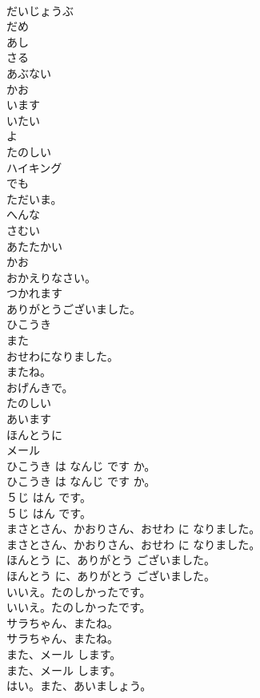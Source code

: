 \documentclass[8pt]{extreport}
\begin{document}
\begin{CJK}{UTF8}{min}
\\	だいじょうぶ
\\	だめ
\\	あし
\\	さる
\\	あぶない
\\	かお
\\	います
\\	いたい
\\	よ
\\	たのしい
\\	ハイキング
\\	でも
\\	ただいま。
\\	へんな
\\	さむい
\\	あたたかい
\\	かお
\\	おかえりなさい。
\\	つかれます
\\	ありがとうございました。
\\	ひこうき
\\	また
\\	おせわになりました。
\\	またね。
\\	おげんきで。
\\	たのしい
\\	あいます
\\	ほんとうに
\\	メール
\\	ひこうき は なんじ です か。	
\\	ひこうき は なんじ です か。 
\\	５じ はん です。	
\\	５じ はん です。 
\\	まさとさん、かおりさん、おせわ に なりました。	
\\	まさとさん、かおりさん、おせわ に なりました。 
\\	ほんとう に、ありがとう ございました。	
\\	ほんとう に、ありがとう ございました。 
\\	いいえ。たのしかったです。	
\\	いいえ。たのしかったです。 
\\	サラちゃん、またね。	
\\	サラちゃん、またね。 
\\	また、メール します。	
\\	また、メール します。 
\\	はい。また、あいましょう。	

\end{CJK}
\end{document}
